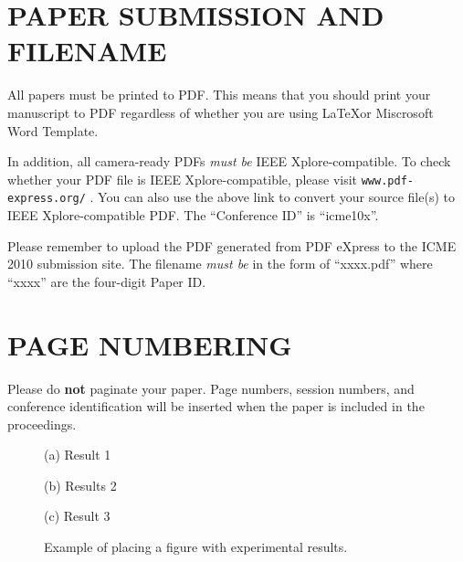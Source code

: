 \documentclass{article}
\begin{document}
\section{PAPER SUBMISSION AND FILENAME}
\label{sec:paperSub}

All papers must be printed to PDF. This means that you should print
your manuscript to PDF regardless of whether you are using \LaTeX or
Miscrosoft Word Template.

In addition, all camera-ready PDFs \emph{must be} IEEE
Xplore-compatible. To check whether your PDF file is IEEE
Xplore-compatible, please visit \verb"www.pdf-express.org/" . You
can also use the above link to convert your source file(s) to IEEE
Xplore-compatible PDF. The ``Conference ID'' is ``icme10x''.

Please remember to upload the PDF generated from PDF eXpress to the
ICME 2010 submission site. The filename \emph{must be} in the form
of ``xxxx.pdf'' where ``xxxx'' are the four-digit Paper ID.


\section{PAGE NUMBERING}
\label{sec:page}

Please do {\bf not} paginate your paper.  Page numbers, session numbers, and
conference identification will be inserted when the paper is included in the
proceedings.

%
\begin{figure}[t]
\begin{minipage}[b]{1.0\linewidth}
  \centering
  \vspace{2.0cm}
  \centerline{(a) Result 1}\medskip
\end{minipage}
%
\begin{minipage}[b]{.48\linewidth}
  \centering
  \vspace{1.5cm}
  \centerline{(b) Results 2}\medskip
\end{minipage}
\hfill
\begin{minipage}[b]{0.48\linewidth}
  \centering
  \vspace{1.5cm}
  \centerline{(c) Result 3}\medskip
\end{minipage}
%
\caption{Example of placing a figure with experimental results.}
\label{fig:res}
\end{figure}
\end{document}
